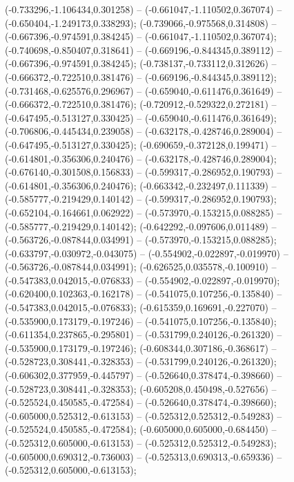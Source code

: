  (-0.733296,-1.106434,0.301258) -- (-0.661047,-1.110502,0.367074) -- (-0.650404,-1.249173,0.338293);
 (-0.739066,-0.975568,0.314808) -- (-0.667396,-0.974591,0.384245) -- (-0.661047,-1.110502,0.367074);
 (-0.740698,-0.850407,0.318641) -- (-0.669196,-0.844345,0.389112) -- (-0.667396,-0.974591,0.384245);
 (-0.738137,-0.733112,0.312626) -- (-0.666372,-0.722510,0.381476) -- (-0.669196,-0.844345,0.389112);
 (-0.731468,-0.625576,0.296967) -- (-0.659040,-0.611476,0.361649) -- (-0.666372,-0.722510,0.381476);
 (-0.720912,-0.529322,0.272181) -- (-0.647495,-0.513127,0.330425) -- (-0.659040,-0.611476,0.361649);
 (-0.706806,-0.445434,0.239058) -- (-0.632178,-0.428746,0.289004) -- (-0.647495,-0.513127,0.330425);
 (-0.690659,-0.372128,0.199471) -- (-0.614801,-0.356306,0.240476) -- (-0.632178,-0.428746,0.289004);
 (-0.676140,-0.301508,0.156833) -- (-0.599317,-0.286952,0.190793) -- (-0.614801,-0.356306,0.240476);
 (-0.663342,-0.232497,0.111339) -- (-0.585777,-0.219429,0.140142) -- (-0.599317,-0.286952,0.190793);
 (-0.652104,-0.164661,0.062922) -- (-0.573970,-0.153215,0.088285) -- (-0.585777,-0.219429,0.140142);
 (-0.642292,-0.097606,0.011489) -- (-0.563726,-0.087844,0.034991) -- (-0.573970,-0.153215,0.088285);
 (-0.633797,-0.030972,-0.043075) -- (-0.554902,-0.022897,-0.019970) -- (-0.563726,-0.087844,0.034991);
 (-0.626525,0.035578,-0.100910) -- (-0.547383,0.042015,-0.076833) -- (-0.554902,-0.022897,-0.019970);
 (-0.620400,0.102363,-0.162178) -- (-0.541075,0.107256,-0.135840) -- (-0.547383,0.042015,-0.076833);
 (-0.615359,0.169691,-0.227070) -- (-0.535900,0.173179,-0.197246) -- (-0.541075,0.107256,-0.135840);
 (-0.611354,0.237865,-0.295801) -- (-0.531799,0.240126,-0.261320) -- (-0.535900,0.173179,-0.197246);
 (-0.608344,0.307186,-0.368617) -- (-0.528723,0.308441,-0.328353) -- (-0.531799,0.240126,-0.261320);
 (-0.606302,0.377959,-0.445797) -- (-0.526640,0.378474,-0.398660) -- (-0.528723,0.308441,-0.328353);
 (-0.605208,0.450498,-0.527656) -- (-0.525524,0.450585,-0.472584) -- (-0.526640,0.378474,-0.398660);
 (-0.605000,0.525312,-0.613153) -- (-0.525312,0.525312,-0.549283) -- (-0.525524,0.450585,-0.472584);
 (-0.605000,0.605000,-0.684450) -- (-0.525312,0.605000,-0.613153) -- (-0.525312,0.525312,-0.549283);
 (-0.605000,0.690312,-0.736003) -- (-0.525313,0.690313,-0.659336) -- (-0.525312,0.605000,-0.613153);
